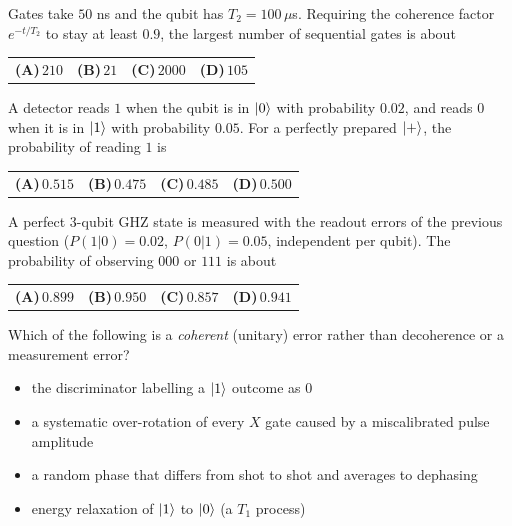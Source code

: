 \documentclass[11pt,a4paper]{article}
\newcommand{\optlabel}[1]{\textbf{(#1)}}
\newenvironment{qitem}[1]{\begin{list}{}{\setlength{\leftmargin}{3.3em}\setlength{\labelwidth}{3.1em}%
  \setlength{\labelsep}{0.2em}\setlength{\topsep}{3pt}\setlength{\parsep}{3pt}}\item[\textbf{Q.#1}\hfill]}{\end{list}}
\newcommand{\qsep}{\par\vspace{2pt}{\color{black!15}\hrule}\vspace{4pt}}
\begin{document}
\begin{qitem}{29}
Gates take $50$ ns and the qubit has $T_2 = 100\,\mu$s. Requiring the coherence factor $e^{-t/T_2}$ to stay at least $0.9$, the largest number of
sequential gates is about
\par\smallskip\noindent\begin{tabularx}{\linewidth}{@{}*{4}{L}@{}}
\optlabel{A}\,$210$ & \optlabel{B}\,$21$ & \optlabel{C}\,$2000$ & \optlabel{D}\,$105$
\end{tabularx}
\end{qitem}
\qsep

\begin{qitem}{30}
A detector reads $1$ when the qubit is in $\ket0$ with probability $0.02$, and reads $0$ when it is in $\ket1$ with probability $0.05$. For a perfectly
prepared $\ket+$, the probability of reading $1$ is
\par\smallskip\noindent\begin{tabularx}{\linewidth}{@{}*{4}{L}@{}}
\optlabel{A}\,$0.515$ & \optlabel{B}\,$0.475$ & \optlabel{C}\,$0.485$ & \optlabel{D}\,$0.500$
\end{tabularx}
\end{qitem}
\qsep

\begin{qitem}{31}
A perfect 3-qubit GHZ state is measured with the readout errors of the previous question ($P(1|0) = 0.02$, $P(0|1) = 0.05$, independent per qubit).
The probability of observing $000$ or $111$ is about
\par\smallskip\noindent\begin{tabularx}{\linewidth}{@{}*{4}{L}@{}}
\optlabel{A}\,$0.899$ & \optlabel{B}\,$0.950$ & \optlabel{C}\,$0.857$ & \optlabel{D}\,$0.941$
\end{tabularx}
\end{qitem}
\qsep

\begin{qitem}{32}
Which of the following is a \emph{coherent} (unitary) error rather than decoherence or a measurement error?
\begin{itemize}[leftmargin=2.6em, labelsep=0.4em, itemsep=2pt, topsep=3pt]
\item[\optlabel{A}] the discriminator labelling a $\ket1$ outcome as $0$
\item[\optlabel{B}] a systematic over-rotation of every $X$ gate caused by a miscalibrated pulse amplitude
\item[\optlabel{C}] a random phase that differs from shot to shot and averages to dephasing
\item[\optlabel{D}] energy relaxation of $\ket1$ to $\ket0$ (a $T_1$ process)
\end{itemize}
\end{qitem}
\qsep
\end{document}
